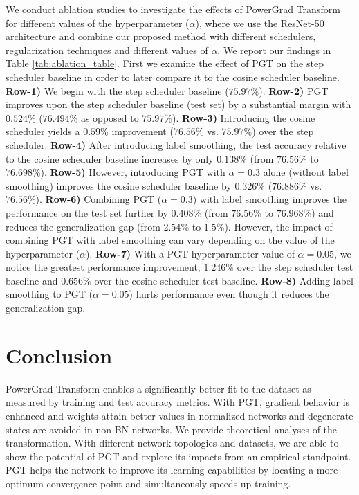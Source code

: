 \documentclass[runningheads]{llncs}
\begin{document}
We conduct ablation studies to investigate the effects of PowerGrad Transform for
different values of the hyperparameter ($\alpha$), where we use the ResNet-50
architecture and combine our proposed method with different schedulers, regularization
techniques and different values of $\alpha$. We report our findings in Table
\ref{tab:ablation_table}. First we examine the effect of PGT on the step scheduler
baseline in order to later compare it to the cosine scheduler baseline. \textbf{Row-1)}
We begin with the step scheduler baseline ($75.97\%$). \textbf{Row-2)} PGT improves upon
the step scheduler baseline (test set) by a substantial margin with $0.524\%$
($76.494\%$ as opposed to $75.97\%$). \textbf{Row-3)} Introducing the cosine scheduler
yields a $0.59\%$ improvement ($76.56\%$ vs. $75.97\%$) over the step scheduler.
\textbf{Row-4)} After introducing label smoothing, the test accuracy relative to the
cosine scheduler baseline increases by only $0.138\%$ (from $76.56\%$ to $76.698\%$).
\textbf{Row-5)} However, introducing PGT with $\alpha=0.3$ alone (without label
smoothing) improves the cosine scheduler baseline by $0.326\%$ ($76.886\%$ vs.
$76.56\%$). \textbf{Row-6)} Combining PGT ($\alpha=0.3$) with label smoothing improves
the performance on the test set further by $0.408\%$ (from $76.56\%$ to $76.968\%$) and
reduces the generalization gap (from $2.54\%$ to $1.5\%$). However, the impact of
combining PGT with label smoothing can vary depending on the value of the hyperparameter
($\alpha$). \textbf{Row-7)} With a PGT hyperparameter value of $\alpha=0.05$, we notice
the greatest performance improvement, $1.246\%$ over the step scheduler test baseline
and $0.656\%$ over the cosine scheduler test baseline. \textbf{Row-8)} Adding label
smoothing to PGT ($\alpha=0.05$) hurts performance even though it reduces the
generalization gap.

\section{Conclusion}
\label{sec:Conc}


PowerGrad Transform enables a significantly better fit to the dataset as measured by
training and test accuracy metrics. With PGT, gradient behavior is enhanced and weights
attain better values in normalized networks and degenerate states are avoided in non-BN
networks. We provide theoretical analyses of the transformation. With different network
topologies and datasets, we are able to show the potential of PGT and explore its
impacts from an empirical standpoint. PGT helps the network to improve its learning
capabilities by locating a more optimum convergence point and simultaneously speeds up
training.
\end{document}
